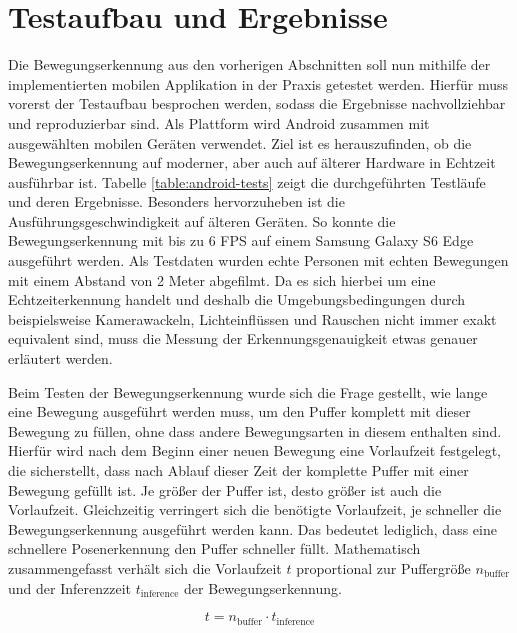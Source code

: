 \section{Testaufbau und Ergebnisse}
Die Bewegungserkennung aus den vorherigen Abschnitten soll nun mithilfe der
implementierten mobilen Applikation in der Praxis getestet werden. Hierfür muss
vorerst der Testaufbau besprochen werden, sodass die Ergebnisse nachvollziehbar
und reproduzierbar sind. Als Plattform wird Android zusammen mit ausgewählten
mobilen Geräten verwendet. Ziel ist es herauszufinden, ob die Bewegungserkennung
auf moderner, aber auch auf älterer Hardware in Echtzeit ausführbar ist. Tabelle
\ref{table:android-tests} zeigt die durchgeführten Testläufe und deren
Ergebnisse. Besonders hervorzuheben ist die Ausführungsgeschwindigkeit auf
älteren Geräten. So konnte die Bewegungserkennung mit bis zu 6 FPS auf einem
Samsung Galaxy S6 Edge ausgeführt werden. Als Testdaten wurden echte Personen
mit echten Bewegungen mit einem Abstand von 2 Meter abgefilmt. Da es sich
hierbei um eine Echtzeiterkennung handelt und deshalb die Umgebungsbedingungen
durch beispielsweise Kamerawackeln, Lichteinflüssen und Rauschen nicht immer
exakt equivalent sind, muss die Messung der Erkennungsgenauigkeit etwas genauer
erläutert werden.

Beim Testen der Bewegungserkennung wurde sich die Frage gestellt, wie lange
eine Bewegung ausgeführt werden muss, um den Puffer komplett mit dieser
Bewegung zu füllen, ohne dass andere Bewegungsarten in diesem enthalten sind.
Hierfür wird nach dem Beginn einer neuen Bewegung eine Vorlaufzeit festgelegt,
die sicherstellt, dass nach Ablauf dieser Zeit der komplette Puffer mit einer
Bewegung gefüllt ist. Je größer der Puffer ist, desto größer ist auch die
Vorlaufzeit. Gleichzeitig verringert sich die benötigte Vorlaufzeit, je
schneller die Bewegungserkennung ausgeführt werden kann. Das bedeutet
lediglich, dass eine schnellere Posenerkennung den Puffer schneller füllt.
Mathematisch zusammengefasst verhält sich die Vorlaufzeit $t$ proportional zur
Puffergröße $n_\mathrm{buffer}$ und der Inferenzzeit $t_\mathrm{inference}$ der
Bewegungserkennung.

\begin{equation}\label{eq:preruntime}
  t = n_\mathrm{buffer} \cdot t_\mathrm{inference}
\end{equation}

